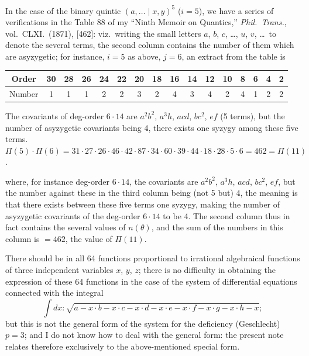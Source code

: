 \documentclass[11pt,a4paper]{book}
\begin{document}
In the case of the binary quintic $(a, \dots \mid x, y)^5$ ($i = 5$), we have a series of verifications in the Table 88 of my ``Ninth Memoir on Quantics,'' \textit{Phil.\ Trans.}, vol.\ CLXI.\ (1871), [462]: viz.\ writing the small letters $a$, $b$, $c$, \dots, $u$, $v$, \dots\ to denote the several terms, the second column contains the number of them which are asyzygetic; for instance, $i = 5$ as above, $j = 6$, an extract from the table is
\begin{center}
\begin{tabular}{c|ccccccccccccccc}
Order & 30 & 28 & 26 & 24 & 22 & 20 & 18 & 16 & 14 & 12 & 10 & 8 & 6 & 4 & 2 \\
\hline
Number & 1 & 1 & 1 & 2 & 2 & 3 & 2 & 4 & 3 & 4 & 2 & 4 & 1 & 2 & 2 \\
\hline
\end{tabular}
\end{center}
The covariants of deg-order $6 \cdot 14$ are $a^2b^2$, $a^3h$, $acd$, $bc^2$, $ef$ (5 terms), but the number of asyzygetic covariants being 4, there exists one syzygy among these five terms.
$\Pi(5) \cdot \Pi(6) = 31 \cdot 27 \cdot 26 \cdot 46 \cdot 42 \cdot 87 \cdot 34 \cdot 60 \cdot 39 \cdot 44 \cdot 18 \cdot 28 \cdot 5 \cdot 6 = 462 = \Pi(11)$.

\clearpage
where, for instance deg-order $6 \cdot 14$, the covariants are $a^2b^2$, $a^3h$, $acd$, $bc^2$, $ef$, but the number against these in the third column being (not 5 but) 4, the meaning is that there exists between these five terms one syzygy, making the number of asyzygetic covariants of the deg-order $6 \cdot 14$ to be 4. The second column thus in fact contains the several values of $n(\theta)$, and the sum of the numbers in this column is $= 462$, the value of $\Pi(11)$.

\clearpage

There should be in all 64 functions proportional to irrational algebraical functions of three independent variables $x$, $y$, $z$; there is no difficulty in obtaining the expression of these 64 functions in the case of the system of differential equations connected with the integral
\[
\int dx : \sqrt{a - x \cdot b - x \cdot c - x \cdot d - x \cdot e - x \cdot f - x \cdot g - x \cdot h - x};
\]
but this is not the general form of the system for the deficiency (Geschlecht) $p = 3$; and I do not know how to deal with the general form: the present note relates therefore exclusively to the above-mentioned special form.
\end{document}
